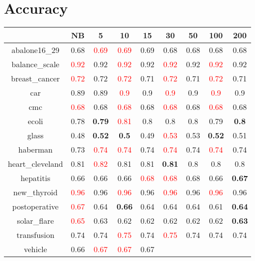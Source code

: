 \documentclass{article}%
\begin{document}
%
\normalsize%
\section*{Accuracy}%
\begin{tabular}{c|cccccccc}%
\hline%
&NB&5&10&15&30&50&100&200\\%
\hline%
abalone16\_29&0.68&\textcolor{red}{ 
0.69
}&\textcolor{red}{ 
0.69
}&0.69&0.68&0.68&0.68&0.68\\%
\hline%
balance\_scale&\textcolor{red}{ 
0.92
}&0.92&\textcolor{red}{ 
0.92
}&0.92&\textcolor{red}{ 
0.92
}&0.92&\textcolor{red}{ 
0.92
}&0.92\\%
\hline%
breast\_cancer&\textcolor{red}{ 
0.72
}&0.72&\textcolor{red}{ 
0.72
}&0.71&\textcolor{red}{ 
0.72
}&0.71&\textcolor{red}{ 
0.72
}&0.71\\%
\hline%
car&0.89&0.89&\textcolor{red}{ 
0.9
}&0.9&\textcolor{red}{ 
0.9
}&0.9&\textcolor{red}{ 
0.9
}&0.9\\%
\hline%
cmc&\textcolor{red}{ 
0.68
}&0.68&\textcolor{red}{ 
0.68
}&0.68&\textcolor{red}{ 
0.68
}&0.68&\textcolor{red}{ 
0.68
}&0.68\\%
\hline%
ecoli&0.78&\textbf{0.79}&\textcolor{red}{ 
0.81
}&0.8&0.8&0.8&0.79&\textbf{0.8}\\%
\hline%
glass&0.48&\textbf{0.52}&\textbf{0.5}&0.49&\textcolor{red}{ 
0.53
}&0.53&\textbf{0.52}&0.51\\%
\hline%
haberman&0.73&\textcolor{red}{ 
0.74
}&\textcolor{red}{ 
0.74
}&0.74&\textcolor{red}{ 
0.74
}&0.74&\textcolor{red}{ 
0.74
}&0.74\\%
\hline%
heart\_cleveland&0.81&\textcolor{red}{ 
0.82
}&0.81&0.81&\textbf{0.81}&0.8&0.8&0.8\\%
\hline%
hepatitis&0.66&0.66&0.66&\textcolor{red}{ 
0.68
}&\textcolor{red}{ 
0.68
}&0.68&0.66&\textbf{0.67}\\%
\hline%
new\_thyroid&\textcolor{red}{ 
0.96
}&0.96&\textcolor{red}{ 
0.96
}&0.96&\textcolor{red}{ 
0.96
}&0.96&\textcolor{red}{ 
0.96
}&0.96\\%
\hline%
postoperative&\textcolor{red}{ 
0.67
}&0.64&\textbf{0.66}&0.64&0.64&0.64&0.61&\textbf{0.64}\\%
\hline%
solar\_flare&\textcolor{red}{ 
0.65
}&0.63&0.62&0.62&0.62&0.62&0.62&\textbf{0.63}\\%
\hline%
transfusion&0.74&0.74&\textcolor{red}{ 
0.75
}&0.74&\textcolor{red}{ 
0.75
}&0.74&0.74&0.74\\%
\hline%
vehicle&0.66&\textcolor{red}{ 
0.67
}&\textcolor{red}{ 
0.67
}&0.67&\textcolor{red}{ 
}
\end{tabular}
\end{document}
